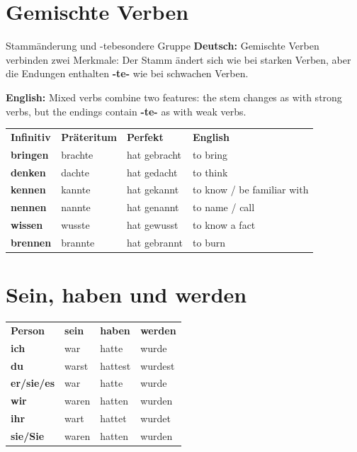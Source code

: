 \documentclass[a4paper,11pt]{article}
\newcommand{\GermanText}[1]{\textbf{Deutsch: }#1\par}
\newcommand{\EnglishText}[1]{{\small\color{SoftGray}\textbf{English: }#1\par}}
\begin{document}
    
    \section{Gemischte Verben}
        
        \begin{grammarentry}{Stammänderung und -te}{besondere Gruppe}
            \GermanText{Gemischte Verben verbinden zwei Merkmale: Der Stamm ändert sich wie bei starken Verben, aber die Endungen enthalten \textbf{-te-} wie bei schwachen Verben.}
            \EnglishText{Mixed verbs combine two features: the stem changes as with strong verbs, but the endings contain \textbf{-te-} as with weak verbs.}
        \end{grammarentry}
        
        \begin{longtable}{>{\bfseries}p{3cm}|p{3cm}|p{3.5cm}|p{4.2cm}}
            \rowcolor{HeaderBlueDark}
            \color{white}\textbf{Infinitiv} &
            \color{white}\textbf{Präteritum} &
            \color{white}\textbf{Perfekt} &
            \color{white}\textbf{English} \\
            bringen & brachte & hat gebracht & to bring \\
            denken & dachte & hat gedacht & to think \\
            kennen & kannte & hat gekannt & to know / be familiar with \\
            nennen & nannte & hat genannt & to name / call \\
            wissen & wusste & hat gewusst & to know a fact \\
            brennen & brannte & hat gebrannt & to burn \\
        \end{longtable}
    
    
    \section{Sein, haben und werden}
        
        \begin{longtable}{>{\bfseries}p{2.3cm}|p{3cm}|p{3cm}|p{3cm}}
            \rowcolor{HeaderBlueDark}
            \color{white}\textbf{Person} &
            \color{white}\textbf{sein} &
            \color{white}\textbf{haben} &
            \color{white}\textbf{werden} \\
            ich & war & hatte & wurde \\
            du & warst & hattest & wurdest \\
            er/sie/es & war & hatte & wurde \\
            wir & waren & hatten & wurden \\
            ihr & wart & hattet & wurdet \\
            sie/Sie & waren & hatten & wurden \\
        \end{longtable}
        
\end{document}
